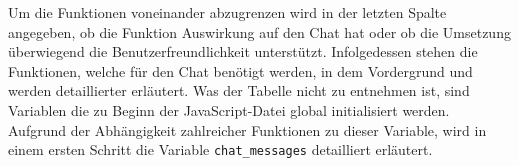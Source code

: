 \documentclass[a4paper,titlepage,halfparskip,12pt]{scrreprt}
\begin{document}
\begin{onehalfspacing}
\begin{table}[h]
\begin{tabular}{|p{2.5cm}|p{8.8cm}|p{3.5cm}|}
		\hline
	\end{tabular}
	\label{tab:JavaScript Aufgabendefinition für gochat.html}
\end{table}
Um die Funktionen voneinander abzugrenzen wird in der letzten Spalte angegeben, ob die Funktion Auswirkung auf den Chat hat oder ob die Umsetzung überwiegend die Benutzerfreundlichkeit unterstützt. Infolgedessen stehen die Funktionen, welche für den Chat benötigt werden, in dem Vordergrund und werden detaillierter erläutert.
Was der Tabelle nicht zu entnehmen ist, sind Variablen die zu Beginn der JavaScript-Datei global initialisiert werden. Aufgrund der Abhängigkeit zahlreicher Funktionen zu dieser Variable, wird in einem ersten Schritt die Variable \texttt{chat\_messages} detailliert erläutert.\\

\pagebreak


\end{onehalfspacing}
\end{document}
